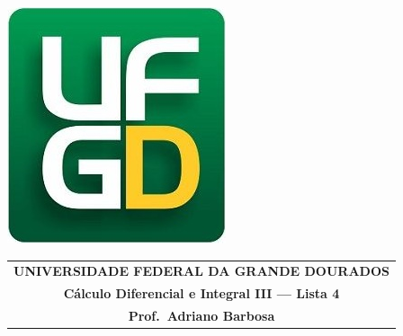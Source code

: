 \documentclass[a4paper,5pt]{amsbook}
\begin{document}
\thispagestyle{empty}
\pagestyle{empty}
\begin{minipage}[h]{0.14\textwidth}
	\includegraphics[scale=0.24]{../../ufgd.png}
\end{minipage}
\begin{minipage}[h]{\textwidth}
\begin{tabular}{c}
{{\bf UNIVERSIDADE FEDERAL DA GRANDE DOURADOS}}\\
{{\bf C\'alculo Diferencial e Integral III --- Lista 4}}\\
{{\bf Prof.\ Adriano Barbosa}}\\
\end{tabular}
\vspace{-0.45cm}
%
\end{minipage}

\end{document}
